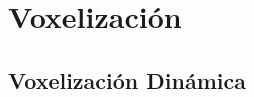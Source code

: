 \section{Voxelización} %
\label{sec:voxelizacion}


\subsection{Voxelización Dinámica} %
\label{sub:voxelizacion_dinamica}

